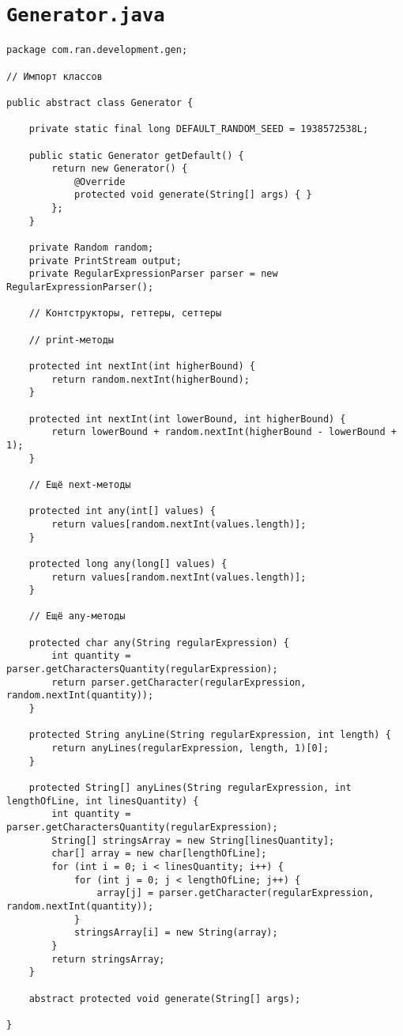 \section*{\texttt{Generator.java}}
\begin{verbatim}
package com.ran.development.gen;

// Импорт классов

public abstract class Generator {

    private static final long DEFAULT_RANDOM_SEED = 1938572538L;
    
    public static Generator getDefault() {
        return new Generator() {
            @Override
            protected void generate(String[] args) { }
        };
    }
    
    private Random random;
    private PrintStream output;
    private RegularExpressionParser parser = new RegularExpressionParser();
    
    // Контструкторы, геттеры, сеттеры
    
    // print-методы
    
    protected int nextInt(int higherBound) {
        return random.nextInt(higherBound);
    }
    
    protected int nextInt(int lowerBound, int higherBound) {
        return lowerBound + random.nextInt(higherBound - lowerBound + 1);
    }
    
    // Ещё next-методы
    
    protected int any(int[] values) {
        return values[random.nextInt(values.length)];
    }
    
    protected long any(long[] values) {
        return values[random.nextInt(values.length)];
    }
    
    // Ещё any-методы
    
    protected char any(String regularExpression) {
        int quantity = parser.getCharactersQuantity(regularExpression);
        return parser.getCharacter(regularExpression, random.nextInt(quantity));
    }
    
    protected String anyLine(String regularExpression, int length) {
        return anyLines(regularExpression, length, 1)[0];
    }
    
    protected String[] anyLines(String regularExpression, int lengthOfLine, int linesQuantity) {
        int quantity = parser.getCharactersQuantity(regularExpression);
        String[] stringsArray = new String[linesQuantity];
        char[] array = new char[lengthOfLine];
        for (int i = 0; i < linesQuantity; i++) {
            for (int j = 0; j < lengthOfLine; j++) {
                array[j] = parser.getCharacter(regularExpression, random.nextInt(quantity));
            }
            stringsArray[i] = new String(array);
        }
        return stringsArray;
    }
    
    abstract protected void generate(String[] args);
    
}
\end{verbatim}

